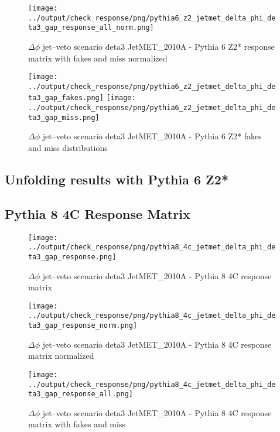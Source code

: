 \documentclass[11pt]{book}
\begin{document}
\begin{figure}[ht]
\centering
\texttt{[image: ../output/check\_response/png/pythia6\_z2\_jetmet\_delta\_phi\_deta3\_gap\_response\_all\_norm.png]}
\caption{$\Delta\phi$ jet--veto scenario deta3 JetMET\_2010A - Pythia 6 Z2* response matrix with fakes and miss normalized}
\label{p6_jetmet_delta_phi_deta3_gap_response_all_norm}
\end{figure}

\begin{figure}[ht]
\centering
\texttt{[image: ../output/check\_response/png/pythia6\_z2\_jetmet\_delta\_phi\_deta3\_gap\_fakes.png]}
\texttt{[image: ../output/check\_response/png/pythia6\_z2\_jetmet\_delta\_phi\_deta3\_gap\_miss.png]}
\caption{$\Delta\phi$ jet--veto scenario deta3 JetMET\_2010A - Pythia 6 Z2* fakes and miss distributions}
\label{p6_jetmet_delta_phi_deta3_gap_fakesmiss}
\end{figure}


\clearpage
\subsection{Unfolding results with Pythia 6 Z2*}


\clearpage
\subsection{Pythia 8 4C Response Matrix}


\begin{figure}[ht]
\centering
\texttt{[image: ../output/check\_response/png/pythia8\_4c\_jetmet\_delta\_phi\_deta3\_gap\_response.png]}
\caption{$\Delta\phi$ jet--veto scenario deta3 JetMET\_2010A - Pythia 8 4C response matrix}
\label{p8_jetmet_delta_phi_deta3_gap_response}
\end{figure}

\begin{figure}[ht]
\centering
\texttt{[image: ../output/check\_response/png/pythia8\_4c\_jetmet\_delta\_phi\_deta3\_gap\_response\_norm.png]}
\caption{$\Delta\phi$ jet--veto scenario deta3 JetMET\_2010A - Pythia 8 4C response matrix normalized}
\label{p8_jetmet_delta_phi_deta3_gap_response_norm}
\end{figure}

\begin{figure}[ht]
\centering
\texttt{[image: ../output/check\_response/png/pythia8\_4c\_jetmet\_delta\_phi\_deta3\_gap\_response\_all.png]}
\caption{$\Delta\phi$ jet--veto scenario deta3 JetMET\_2010A - Pythia 8 4C response matrix with fakes and miss}
\label{p8_jetmet_delta_phi_deta3_gap_response_all}
\end{figure}
\end{document}
